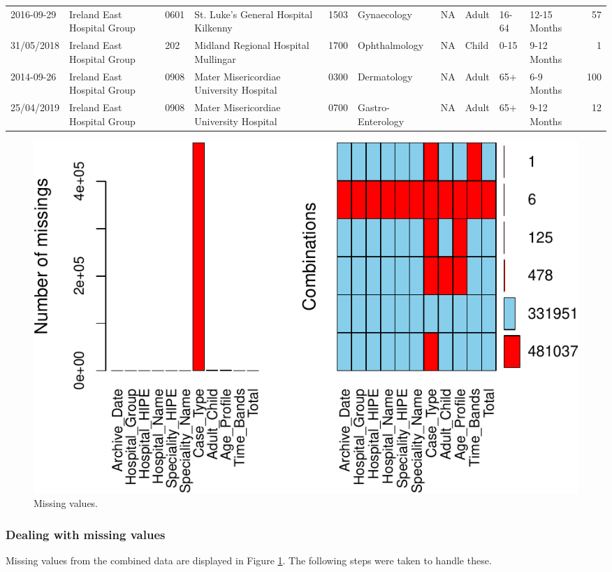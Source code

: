 \documentclass[
  12pt,
]{article}
\begin{document}
\begin{table}[!h]
{\begin{tabular}[t]{llllllllllr}
2016-09-29 & Ireland East Hospital Group & 0601 & St. Luke's General Hospital Kilkenny & 1503 & Gynaecology & NA & Adult & 16-64 & 12-15 Months & 57\\
31/05/2018 & Ireland East Hospital Group & 202 & Midland Regional Hospital Mullingar & 1700 & Ophthalmology & NA & Child & 0-15 & 9-12 Months & 1\\
2014-09-26 & Ireland East Hospital Group & 0908 & Mater Misericordiae University Hospital & 0300 & Dermatology & NA & Adult & 65+ & 6-9 Months & 100\\
25/04/2019 & Ireland East Hospital Group & 0908 & Mater Misericordiae University Hospital & 0700 & Gastro-Enterology & NA & Adult & 65+ & 9-12 Months & 12\\
\bottomrule
\end{tabular}}
\end{table}

\begin{figure}

{\centering \includegraphics{data_science_ca3_files/figure-latex/missing-values-1} 

}

\caption{Missing values.}\label{fig:missing-values}
\end{figure}

\hypertarget{dealing-with-missing-values}{%
\subsubsection{Dealing with missing values}\label{dealing-with-missing-values}}

Missing values from the combined data are displayed in Figure \ref{fig:missing-values}. The following steps were taken to handle these.
\end{document}

